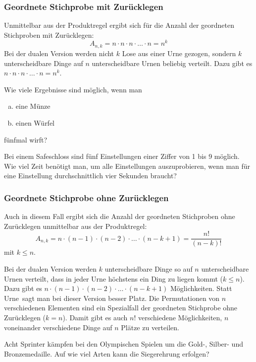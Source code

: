 \documentclass[%
11pt,%
twoside,%
titlepage,%
german,%
headsepline%
]{scrartcl}
\begin{document}
\subsubsection{Geordnete Stichprobe mit Zurücklegen}
Unmittelbar aus der Produktregel ergibt sich für die Anzahl der geordneten Stichproben mit Zurücklegen:
$$A_{n,k} = n\cdot n\cdot n\cdot\dots\cdot n=n^k$$
Bei der dualen Version werden nicht $k$ Lose aus einer Urne gezogen, sondern $k$ unterscheidbare Dinge auf $n$ unterscheidbare Urnen beliebig verteilt. Dazu gibt es $n\cdot n\cdot n\cdot\dots\cdot n=n^k$.

\begin{ueb}[Münze]
Wie viele Ergebnisse sind möglich, wenn man
\begin{enumerate}[a)]
\item eine Münze
\item einen Würfel
\end{enumerate}
fünfmal wirft?
\end{ueb}

\begin{ueb}[Safe]
Bei einem Safeschloss sind fünf Einstellungen einer Ziffer von 1 bis 9 möglich. Wie viel Zeit benötigt man, um alle Einstellungen auszuprobieren, wenn man für eine Einstellung durchschnittlich vier Sekunden braucht?
\end{ueb}

\subsubsection{Geordnete Stichprobe ohne Zurücklegen}
Auch in diesem Fall ergibt sich die Anzahl der geordneten Stichproben ohne Zurücklegen unmittelbar aus der Produktregel:
$$A_{n,k}=n\cdot(n-1)\cdot(n-2)\cdot\dots\cdot(n-k+1) = \frac{n!}{(n-k)!}$$
mit $k\leq n.$

Bei der dualen Version werden $k$ unterscheidbare Dinge so auf $n$ unterscheidbare Urnen verteilt, dass in jeder Urne höchstens ein Ding zu liegen kommt ($k\leq n$). Dazu gibt es $n\cdot(n-1)\cdot(n-2)\cdot\dots\cdot(n-k+1)$ Möglichkeiten.
Statt \glqq Urne\grqq\ sagt man bei dieser Version besser \glqq Platz\grqq.
Die Permutationen von $n$ verschiedenen Elementen sind ein Spezialfall der geordneten Stichprobe ohne Zurücklegen ($k=n$). Damit gibt es auch $n!$ verschiedene Möglichkeiten, $n$ voneinander verschiedene Dinge auf $n$ Plätze zu verteilen.

\begin{ueb}[Sprinter]
Acht Sprinter kämpfen bei den Olympischen Spielen um die Gold-, Silber- und Bronzemedaille. Auf wie viel Arten kann die Siegerehrung erfolgen?
\end{ueb}
\end{document}
